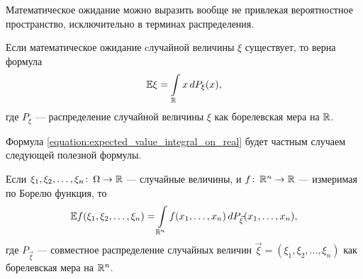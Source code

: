 \documentclass[../main.tex]{subfiles}
\begin{document}
Математическое ожидание можно выразить вообще не привлекая вероятностное пространство, исключительно в терминах распределения.
\begin{prop}
 Если математическое ожидание cлучайной величины $ \xi $ существует, то верна формула
 \begin{align}
  \label{equation:expected_value_integral_on_real}
  \mathbb E\xi = \int\limits_{\mathbb{R}} x\,dP_{\xi}(x),
 \end{align} где $ P_\xi $ --- распределение случайной величины $ \xi $ как борелевская мера на $ \mathbb{R} $.
\end{prop}
Формула \eqref{equation:expected_value_integral_on_real} будет частным случаем следующей полезной формулы.
\begin{prop}
 Если $ \xi_1, \xi_2, \ldots, \xi_n \colon\, \Omega \to \mathbb{R} $ --- случайные величины, и $ f \colon\, \mathbb{R}^{n}\to\mathbb{R} $ --- измеримая по Борелю функция, то
 \begin{align}
  \label{equation:expected_value_of_function}
  \mathbb E f(\xi_1, \xi_2, \ldots, \xi_n) = \int\limits_{\mathbb{R}^{n}} f(x_1, \ldots, x_n) \,d P_{\vec\xi}(x_1, \ldots, x_n),
 \end{align} где $ P_{\vec\xi} $ --- совместное распределение случайных величин $ \vec\xi = (\xi_1, \xi_2, \ldots, \xi_n) $ как борелевская мера на $ \mathbb{R}^{n} $.
\end{prop}
\end{document}
